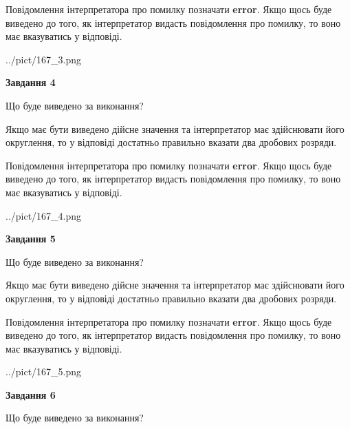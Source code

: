 \documentclass[12pt, ukrainian]{article}
\begin{document}
{\begin {Large}
Повідомлення інтерпретатора про помилку позначати \textbf{error}.
Якщо щось буде виведено до того, як інтерпретатор видасть повідомлення про помилку, 
то воно має вказуватись у відповіді. \par

\begin{center}
	{../pict/167_3.png}
\end{center}
\newpage

{\begin {center}\textbf{Завдання 4}\end {center}}\par
Що буде виведено за виконання? \par

Якщо має бути виведено дійсне значення та інтерпретатор має здійснювати його округлення, 
то у відповіді достатньо правильно вказати два дробових розряди.

Повідомлення інтерпретатора про помилку позначати \textbf{error}.
Якщо щось буде виведено до того, як інтерпретатор видасть повідомлення про помилку, 
то воно має вказуватись у відповіді. \par

\begin{center}
	{../pict/167_4.png}
\end{center}
\newpage

{\begin {center}\textbf{Завдання 5}\end {center}}\par
Що буде виведено за виконання? \par

Якщо має бути виведено дійсне значення та інтерпретатор має здійснювати його округлення, 
то у відповіді достатньо правильно вказати два дробових розряди.

Повідомлення інтерпретатора про помилку позначати \textbf{error}.
Якщо щось буде виведено до того, як інтерпретатор видасть повідомлення про помилку, 
то воно має вказуватись у відповіді. \par

\begin{center}
	{../pict/167_5.png}
\end{center}
\newpage

{\begin {center}\textbf{Завдання 6}\end {center}}\par
Що буде виведено за виконання? \par


\end{Large}}
\end{document}
